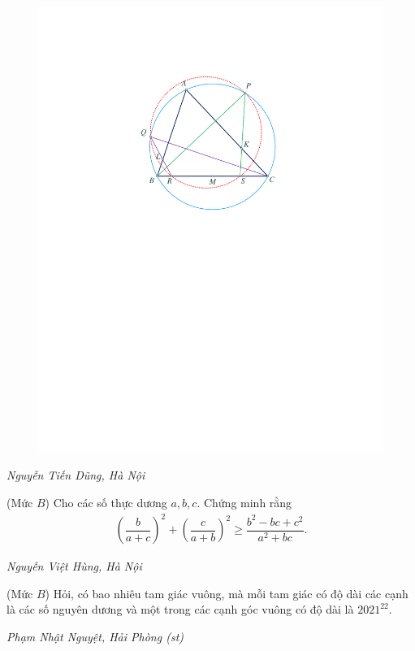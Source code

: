 \begin{multicols}{2}
\begin{figure}[H]
		\includegraphics[width= 0.95\linewidth]{P624}
		\vspace*{-15pt}
	\end{figure}
	\begin{flushright}
		\textit{Nguyễn Tiến Dũng, Hà Nội}
	\end{flushright}
	{}
	(Mức $B$) Cho các số thực dương $a,b,c$. Chứng minh rằng
	\begin{align*}
		\left(\dfrac b{a+c}\right)^2+\left(\dfrac{c}{a+b}\right)^2\ge \dfrac{b^2-bc+c^2}{a^2+bc}.
	\end{align*}
	\begin{flushright}
		\textit{Nguyễn Việt Hùng, Hà Nội}
	\end{flushright}
	{}
	(Mức $B$) Hỏi, có bao nhiêu tam giác vuông, mà mỗi tam giác có độ dài các cạnh là các số nguyên dương và một trong các cạnh góc vuông có độ dài là $2021^{22}$.
	\begin{flushright}
		\textit{Phạm Nhật Nguyệt, Hải Phòng (st)}
	\end{flushright}

\end{multicols}
